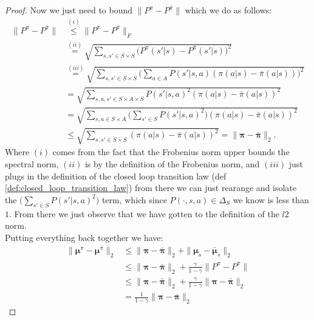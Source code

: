 \begin{proof}
    Now we just need to bound $ \big\|P^{\pi} -P^{\bar{\pi}} \big\|$ which we do as follows:
    \begin{align*}
        \big\| 
            P^{\pi} -P^{\bar{\pi}}
        \big\|
        & \stackrel{(i)}{\leq} 
        \big\| 
            P^{\pi} -P^{\bar{\pi}}
        \big\|_F\\
        & \stackrel{(ii)}{=} 
        \sqrt{
            \sum_{s,s' \in S \times S} 
            \big(
                P^{\pi}(s'|s) - P^{\bar{\pi}}(s'|s)
            \big)^2
        } \\
        & \stackrel{(iii)}{=} 
        \sqrt{
            \sum_{s,s' \in S \times S} 
            \Big(
                \sum_{a\in A}P(s'|s,a) (\pi(a|s)-\bar{\pi}(a|s))
            \Big)^2
        } \\
        & =
        \sqrt{
            \sum_{s,a,s' \in S \times A \times S} 
            P(s'|s,a)^2 
            (\pi(a|s)-\bar{\pi}(a|s))^2
        } \\
        & =
        \sqrt{
            \sum_{s,a \in S \times A} 
            \Big( \sum_{s' \in S} P(s'|s,a)^2  \Big)
            (\pi(a|s)-\bar{\pi}(a|s))^2
        } \\
        & \leq
        \sqrt{
            \sum_{s,s' \in S \times S} 
            (\pi(a|s)-\bar{\pi}(a|s))^2
        } = \| \bm{\pi} - \bar{\bm{\pi}} \|_2.
    \end{align*}
    Where $(i)$ comes from the fact that the Frobenius norm upper bounds the spectral norm, $(ii)$ is by the definition of the Frobenius norm, and $(iii)$ just plugs in the definition of the closed loop transition law (def \ref{def:closed_loop_transition_law}) from there we can just rearange and isolate the $\big( \sum_{s' \in S} P(s'|s,a)^2 \big)$ term, which since $P(\cdot,s,a) \in \Delta_S$ we know is less than $1$. From there we just observe that we have gotten to the definition of the $l2$ norm. \\

    Putting everything back together we have:
    \begin{align*}
        \| \bm{\mu}^{\pi} - \bm{\mu}^{\bar{\pi}} \|_2 
        &\leq 
        \| \bm{\pi} - \bar{\bm{\pi}} \|_2 +
        \| \bm{\mu}_s - \bar{\bm{\mu}}_s \|_2 \\
        &\leq 
        \| \bm{\pi} - \bar{\bm{\pi}} \|_2 +
        \frac{\gamma}{1-\gamma}
        \big\| 
            P^{\pi} -P^{\bar{\pi}}
        \big\| \\ 
        &\leq 
        \| \bm{\pi} - \bar{\bm{\pi}} \|_2 +
        \frac{\gamma}{1-\gamma}
        \| \bm{\pi} - \bar{\bm{\pi}} \|_2 \\
        & = 
        \frac{1}{1-\gamma}
        \| \bm{\pi} - \bar{\bm{\pi}} \|_2
    \end{align*}
\end{proof}

